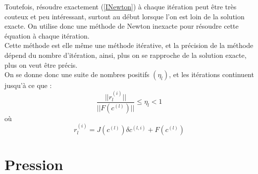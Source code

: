 Toutefois, résoudre exactement (\ref{INewton}) à chaque itération peut être très couteux et peu intéressant, surtout au début lorsque l'on est loin de la solution exacte. On utilise donc une méthode de Newton inexacte pour résoudre cette équation à chaque itération.\\
Cette méthode est elle même une méthode itérative, et la précision de la méthode dépend du nombre d'itération, ainsi, plus on se rapproche de la solution exacte, plus on veut être précis.
\\On se donne donc une suite de nombres positifs $(\eta_l)$, et les itérations continuent jusqu'à ce que :
\[
\frac{||r_l^{(i)}||}{||F(c^{(l)})||} \leq \eta_l<1
\]
où
\[
r_l^{(i)} = J(c^{(l)})\delta c^{(l,i)} + F(c^{(l)})
\]

\section{Pression}



